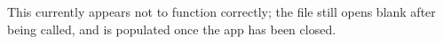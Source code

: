 
\begin{DoxyRefList}
\item[\label{bug__bug000001}%
\hypertarget{bug__bug000001}{}%
Member \hyperlink{class_log_afb04394b40af57b572c2f2a0eb3aa47b}{Log\-:\-:Flush} ()]This currently appears not to function correctly; the file still opens blank after being called, and is populated once the app has been closed. 
\end{DoxyRefList}